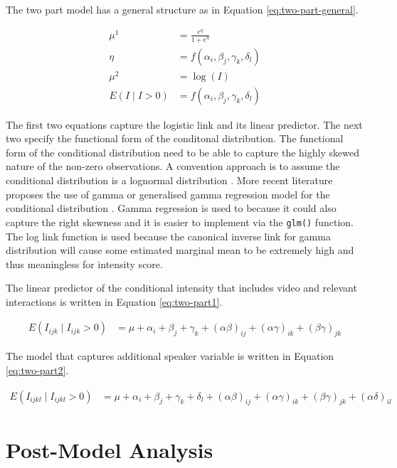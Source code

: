 \documentclass{monashthesis}
\begin{document}
The two part model has a general structure as in Equation \ref{eq:two-part-general}.

\begin{align}\label{eq:two-part-general}
\mu^1 &= \frac{e^{\eta}}{1 + e^{\eta}} \\
\eta &= f(\alpha_i, \beta_j, \gamma_k, \delta_l) \\
\mu^2 &= \log(I) \\
E(I \mid I > 0) &= f(\alpha_i, \beta_j, \gamma_k, \delta_l)
\end{align}

\noindent The first two equations capture the logistic link and its linear predictor. The next two specify the functional form of the conditonal distribution. The functional form of the conditional distribution need to be able to capture the highly skewed nature of the non-zero observations. A convention approach is to assume the conditional distribution is a lognormal distribution \autocites{manning1981two}{diehr1999methods}. More recent literature proposes the use of gamma or generalised gamma regression model for the conditional distribution \autocite{twopart2010}. Gamma regression is used to because it could also capture the right skewness and it is easier to implement via the \texttt{glm()} function. The log link function is used because the canonical inverse link for gamma distribution will cause some estimated marginal mean to be extremely high and thus meaningless for intensity score.

The linear predictor of the conditional intensity that includes video and relevant interactions is written in Equation \ref{eq:two-part1}.

\begin{align}\label{eq:two-part1}
E(I_{ijk} \mid I_{ijk} > 0) &= \mu + \alpha_i + \beta_j +\gamma_k + (\alpha\beta)_{ij} + (\alpha\gamma)_{ik} + (\beta\gamma)_{jk}
\end{align}

The model that captures additional speaker variable is written in Equation \ref{eq:two-part2}.

\begin{align}\label{eq:two-part2}
E(I_{ijkl} \mid I_{ijkl} > 0) &= \mu + \alpha_i + \beta_j +\gamma_k + \delta_l + (\alpha\beta)_{ij} + (\alpha\gamma)_{ik} + (\beta\gamma)_{jk} + (\alpha\delta)_{il}
\end{align}

\hypertarget{post-model-analysis}{%
\section{Post-Model Analysis}\label{post-model-analysis}}
\end{document}
